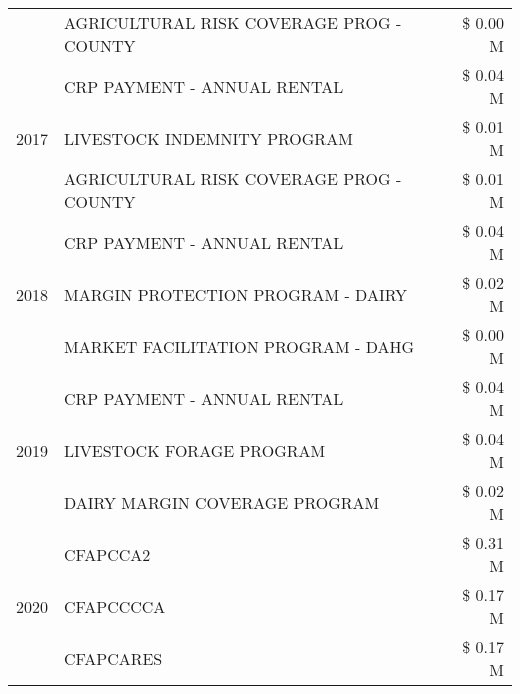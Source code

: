 \begin{tabular}{llr}
 & AGRICULTURAL RISK COVERAGE PROG - COUNTY & \$ 0.00 M \\
\cline{1-3}
\multirow[t]{3}{*}{2017} & CRP PAYMENT - ANNUAL RENTAL & \$ 0.04 M \\
 & LIVESTOCK INDEMNITY PROGRAM & \$ 0.01 M \\
 & AGRICULTURAL RISK COVERAGE PROG - COUNTY & \$ 0.01 M \\
\cline{1-3}
\multirow[t]{3}{*}{2018} & CRP PAYMENT - ANNUAL RENTAL & \$ 0.04 M \\
 & MARGIN PROTECTION PROGRAM - DAIRY & \$ 0.02 M \\
 & MARKET FACILITATION PROGRAM - DAHG & \$ 0.00 M \\
\cline{1-3}
\multirow[t]{3}{*}{2019} & CRP PAYMENT - ANNUAL RENTAL & \$ 0.04 M \\
 & LIVESTOCK FORAGE PROGRAM & \$ 0.04 M \\
 & DAIRY MARGIN COVERAGE PROGRAM & \$ 0.02 M \\
\cline{1-3}
\multirow[t]{3}{*}{2020} & CFAPCCA2 & \$ 0.31 M \\
 & CFAPCCCCA & \$ 0.17 M \\
 & CFAPCARES & \$ 0.17 M \\
\cline{1-3}
\bottomrule
\end{tabular}
